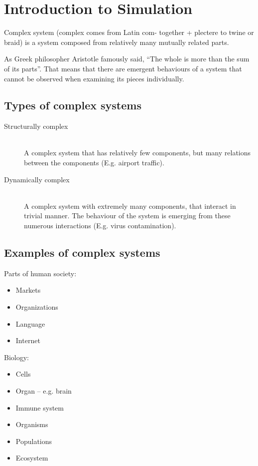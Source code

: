 \documentclass[a4paper]{article}
\begin{document}

\section{Introduction to Simulation}

Complex system (complex comes from Latin com-  together + plectere  to twine or braid) is a system composed from relatively many mutually related  parts.

As Greek philosopher Aristotle famously said, ``The whole is more than the sum of its parts''.
That means that there are emergent behaviours of a system that cannot be observed
when examining its pieces individually.

\subsection{Types of complex systems}

\begin{description}
\item[Structurally complex] \hfill \\
A complex system that has relatively few components, but many relations
between the components (E.g. airport traffic).
\item[Dynamically complex] \hfill \\
A complex system with extremely many components, that interact in trivial manner.
The behaviour of the system is emerging from these numerous interactions (E.g. virus contamination).
\end{description}

\subsection{Examples of complex systems\cite{burian_complex_????}}

Parts of human society:

\begin{itemize}
\item    Markets
\item    Organizations
\item    Language
\item    Internet
\end{itemize}

Biology:	
\begin{itemize}
\item    Cells
\item    Organ – e.g. brain
\item    Immune system
\item    Organisms
\item    Populations
\item    Ecosystem
\end{itemize}
	
\end{document}
